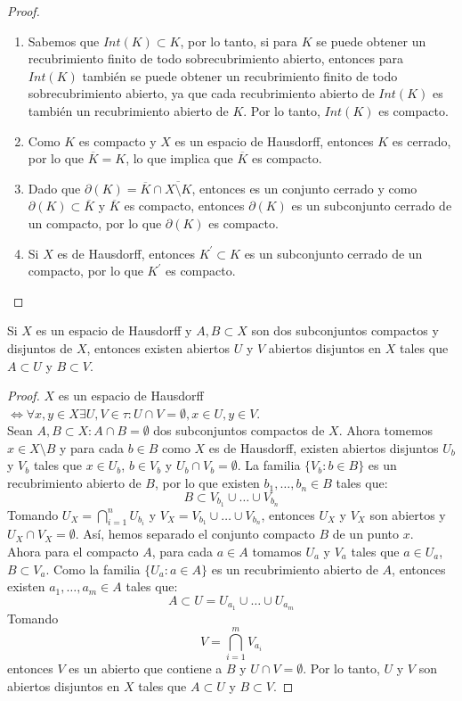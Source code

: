 \begin{proof}
    \begin{enumerate}
        \item Sabemos que $Int(K) \subset K$, por lo tanto, si para $K$ se puede obtener un recubrimiento finito de todo sobrecubrimiento abierto, entonces para $Int(K)$ también se puede obtener un recubrimiento finito de todo sobrecubrimiento abierto, ya que cada recubrimiento abierto de $Int(K)$ es también un recubrimiento abierto de $K$. Por lo tanto, $Int(K)$ es compacto.
        \item Como $K$ es compacto y $X$ es un espacio de Hausdorff, entonces $K$ es cerrado, por lo que $\overline{K} = K$, lo que implica que $\overline{K}$ es compacto. 
        \item Dado que $\partial(K) = \overline{K} \cap \overline{X \setminus K}$, entonces es un conjunto cerrado y como $\partial(K) \subset \overline{K}$ y $\overline{K}$ es compacto, entonces $\partial(K)$ es un subconjunto cerrado de un compacto, por lo que $\partial(K)$ es compacto.
        \item Si $X$ es de Hausdorff, entonces $K^{\prime} \subset K$ es un subconjunto cerrado de un compacto, por lo que $K^{\prime}$ es compacto.
    \end{enumerate} 
\end{proof}
\begin{proposición}
    Si $X$ es un espacio de Hausdorff y $A, B \subset X$ son dos subconjuntos compactos y disjuntos de $X$, entonces existen abiertos $U$ y $V$ abiertos disjuntos en $X$ tales que $A \subset U$ y $B \subset V$.
\end{proposición}
\begin{proof}
    $X$ es un espacio de Hausdorff $\iff \forall x, y \in X \exists U, V \in \tau : U \cap V = \emptyset, x \in U, y \in V$. \\
    Sean $A,B \subset X : A \cap B = \emptyset$ dos subconjuntos compactos de $X$. Ahora tomemos $x \in X \setminus B$ y para cada $b \in B$ como $X$ es de Hausdorff, existen abiertos disjuntos $U_b$ y $V_b$ tales que $x \in U_b$, $b \in V_b$ y $U_b \cap V_b = \emptyset$. La familia $\{V_b : b \in B\}$ es un recubrimiento abierto de $B$, por lo que existen $b_1, \ldots, b_n \in B$ tales que: 
    $$B \subset V_{b_1} \cup \ldots \cup V_{b_n}$$
    Tomando $U_X = \bigcap_{i = 1}^{n} U_{b_i}$ y $V_X = V_{b_1} \cup \ldots \cup V_{b_n}$, entonces $U_X$ y $V_X$ son abiertos y $U_X \cap V_X = \emptyset$. Así, hemos separado el conjunto compacto $B$ de un punto $x$. \\
    Ahora para el compacto $A$, para cada $a \in A$ tomamos $U_a$ y $V_a$ tales que $a \in U_a$, $B \subset V_a$. Como la familia $\{U_a : a \in A\}$ es un recubrimiento abierto de $A$, entonces existen $a_1, \ldots, a_m \in A$ tales que:
    $$ A \subset U = U_{a_1} \cup \ldots \cup U_{a_m}$$
    Tomando 
    $$V = \bigcap_{i = 1}^{m} V_{a_i}$$
    entonces $V$ es un abierto que contiene a $B$ y $U \cap V = \emptyset$. Por lo tanto, $U$ y $V$ son abiertos disjuntos en $X$ tales que $A \subset U$ y $B \subset V$.
\end{proof}
